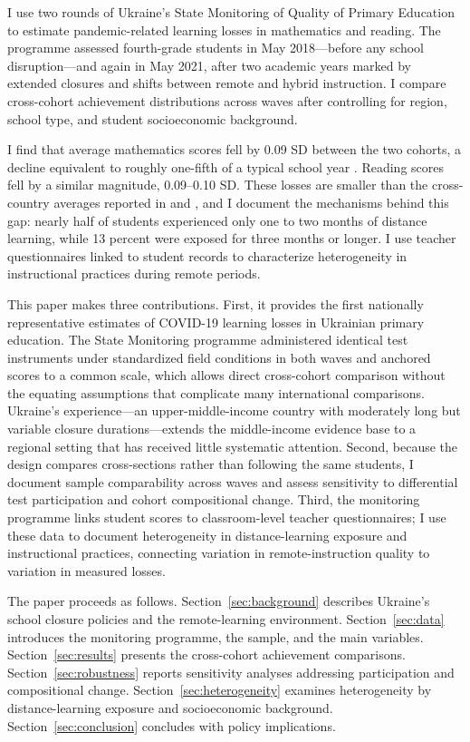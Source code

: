 I use two rounds of Ukraine's State Monitoring of Quality of Primary Education
\citep{uceqa2025} to estimate pandemic-related learning losses in mathematics and reading. The programme assessed fourth-grade students in May 2018---before any school disruption---and again in May 2021, after two academic years marked by extended closures and shifts between remote and hybrid instruction. I compare cross-cohort achievement distributions across waves after controlling for region, school type, and student socioeconomic background.

I find that average mathematics scores fell by 0.09 SD between the two cohorts, a decline equivalent to roughly one-fifth of a typical school year \citep{hill2008empirical}. Reading scores fell by a similar magnitude, 0.09--0.10 SD. These losses are smaller than the cross-country averages reported in \citet{betthauser2023systematic} and \citet{patrinos2022analysis}, and I document the mechanisms behind this gap: nearly half of students experienced only one to two months of distance learning, while 13 percent were exposed for three months or longer. I use teacher questionnaires linked to student records to characterize heterogeneity in instructional practices during remote periods.

This paper makes three contributions. First, it provides the first nationally representative estimates of COVID-19 learning losses in Ukrainian primary education. The State Monitoring programme administered identical test instruments under standardized field conditions in both waves and anchored scores to a common scale, which allows direct cross-cohort comparison without the equating assumptions that complicate many international comparisons. Ukraine's experience---an upper-middle-income country with moderately long but variable closure durations---extends the middle-income evidence base to a regional setting that has received little systematic attention. Second, because the design compares cross-sections rather than following the same students, I document sample comparability across waves and assess sensitivity to differential test participation and cohort compositional change. Third, the monitoring programme links student scores to classroom-level teacher questionnaires; I use these data to document heterogeneity in distance-learning exposure and instructional practices, connecting variation in remote-instruction quality to variation in measured losses.

The paper proceeds as follows. Section~\ref{sec:background} describes Ukraine's school closure policies and the remote-learning environment. Section~\ref{sec:data} introduces the monitoring programme, the sample, and the main variables. Section~\ref{sec:results} presents the cross-cohort achievement comparisons. Section~\ref{sec:robustness} reports sensitivity analyses addressing participation and compositional change. Section~\ref{sec:heterogeneity} examines heterogeneity by distance-learning exposure and socioeconomic background. Section~\ref{sec:conclusion} concludes with policy implications.
